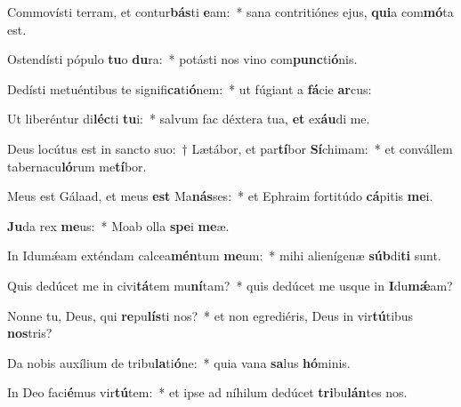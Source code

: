 \item Commovísti terram, et contur\textbf{bás}ti \textbf{e}am:~* sana contritiónes ejus, \textbf{qui}a com\textbf{mó}ta est.
\item Ostendísti pópulo \textbf{tu}o \textbf{du}ra:~* potásti nos vino com\textbf{punc}ti\textbf{ó}nis.
\item Dedísti metuéntibus te signifi\textbf{ca}ti\textbf{ó}nem:~* ut fúgiant a \textbf{fá}cie \textbf{ar}cus:
\item Ut liberéntur di\textbf{léc}ti \textbf{tu}i:~* salvum fac déxtera tua, \textbf{et} ex\textbf{áu}di me.
\item Deus locútus est in sancto suo:~† Lætábor, et par\textbf{tí}bor \textbf{Sí}chimam:~* et convállem tabernacu\textbf{ló}rum me\textbf{tí}bor.
\item Meus est Gálaad, et meus \textbf{est} Ma\textbf{nás}ses:~* et Ephraim fortitúdo \textbf{cá}pitis \textbf{me}i.
\item \textbf{Ju}da rex \textbf{me}us:~* Moab olla \textbf{spe}i \textbf{me}æ.
\item In Idumǽam exténdam calcea\textbf{mén}tum \textbf{me}um:~* mihi alienígenæ \textbf{súb}di\textbf{ti} sunt.
\item Quis dedúcet me in civi\textbf{tá}tem mu\textbf{ní}tam?~* quis dedúcet me usque in \textbf{I}du\textbf{mǽ}am?
\item Nonne tu, Deus, qui \textbf{re}pu\textbf{lís}ti nos?~* et non egrediéris, Deus in vir\textbf{tú}tibus \textbf{nos}tris?
\item Da nobis auxílium de tribu\textbf{la}ti\textbf{ó}ne:~* quia vana \textbf{sa}lus \textbf{hó}minis.
\item In Deo faci\textbf{é}mus vir\textbf{tú}tem:~* et ipse ad níhilum dedúcet \textbf{tri}bu\textbf{lán}tes nos.
